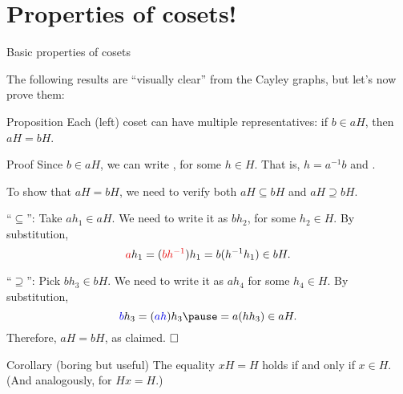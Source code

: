 \documentclass[8pt, handout]{beamer}
\newcommand{\Pause}{\pause}      %
\begin{document}
\section{Properties of cosets!}


\begin{frame}{Basic properties of cosets}
  
  The following results are ``visually clear'' from the Cayley
  graphs, but let's now prove them:

  \begin{block}{Proposition}
    Each (left) coset can have multiple representatives: if $b\in aH$,
    then $aH=bH$.
  \end{block}
  
  \begin{exampleblock}{Proof} \Pause
    Since $b\in aH$, we can write , for some $h\in
    H$. \pause That is, $h=a^{-1}b$ and
    . \medskip\pause
    
    To show that $aH=bH$, we need to verify both $aH\subseteq bH$ and
    $aH\supseteq bH$. \medskip\pause
    
    ``$\subseteq$'': Take $ah_1\in aH$. \Pause We need to write it as
    $bh_2$, for some $h_2\in H$. \pause By substitution,
    \[
    \Alert{a}h_1=(\Alert{bh^{-1}})h_1=b(h^{-1}h_1)\in bH.
    \]

    \pause ``$\supseteq$'': Pick $bh_3\in bH$. \Pause We need to write it as
    $ah_4$ for some $h_4\in H$. \pause By substitution,
    \[
    \Balert{b}h_3=(\Balert{ah})h_3\Pause=a(hh_3)\in aH.
    \]
    \pause Therefore, $aH=bH$, as claimed.  $\hfill\Box$
  \end{exampleblock}

  \pause
  
  \begin{block}{Corollary (boring but useful)}
    The equality $xH=H$ holds if and only if $x\in H$. (And
    analogously, for $Hx=H$.)
  \end{block}
  
\end{frame}

\end{document}

